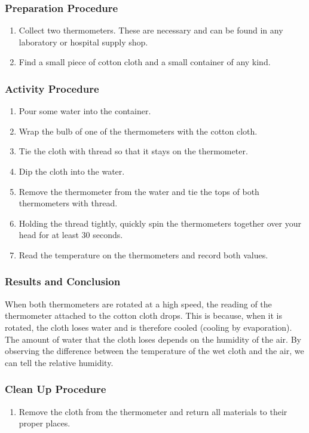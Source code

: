 \subsubsection*{Preparation Procedure}
\begin{enumerate}
\item{Collect two thermometers.  These are necessary and can be found in any laboratory or hospital supply shop.}
\item{Find a small piece of cotton cloth and a small container of any kind.}
\end{enumerate}

\subsubsection*{Activity Procedure}
\begin{enumerate}
\item{Pour some water into the container.}
\item{Wrap the bulb of one of the thermometers with the cotton cloth.}
\item{Tie the cloth with thread so that it stays on the thermometer.}
\item{Dip the cloth into the water.}
\item{Remove the thermometer from the water and tie the tops of both thermometers with thread.}
\item{Holding the thread tightly, quickly spin the thermometers together over your head for at least 30 seconds.}
\item{Read the temperature on the thermometers and record both values.}
\end{enumerate}

\subsubsection*{Results and Conclusion}
When both thermometers are rotated at a high speed, the reading of the thermometer attached to the cotton cloth drops.  This is because, when it is rotated, the cloth loses water and is therefore cooled (cooling by evaporation).  The amount of water that the cloth loses depends on the humidity of the air.  By observing the difference between the temperature of the wet cloth and the air, we can tell the relative humidity.

\subsubsection*{Clean Up Procedure}
\begin{enumerate}
\item{Remove the cloth from the thermometer and return all materials to their proper places.}
\end{enumerate}

